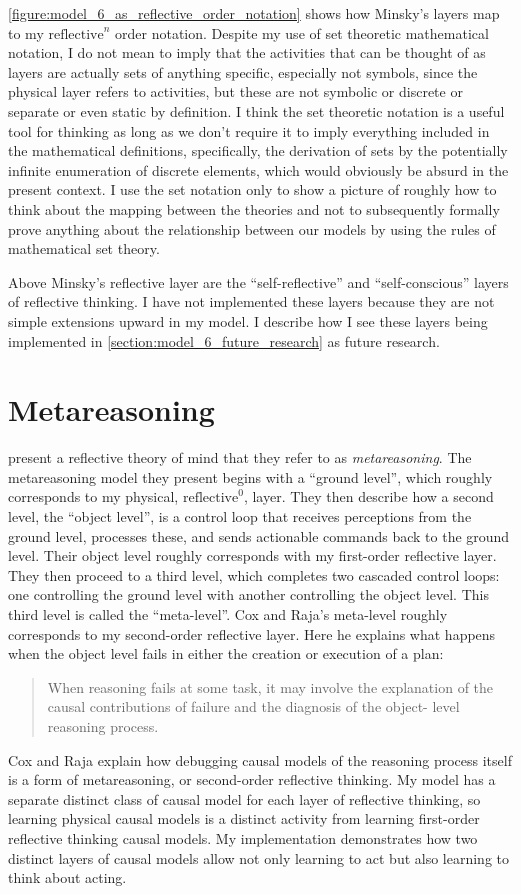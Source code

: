\autoref{figure:model_6_as_reflective_order_notation} shows how
Minsky's layers map to my $\text{reflective}^n$ order notation.
Despite my use of set theoretic mathematical notation, I do not mean
to imply that the activities that can be thought of as layers are
actually sets of anything specific, especially not symbols, since the
physical layer refers to activities, but these are not symbolic or
discrete or separate or even static by definition.  I think the set
theoretic notation is a useful tool for thinking as long as we don't
require it to imply everything included in the mathematical
definitions, specifically, the derivation of sets by the potentially
infinite enumeration of discrete elements, which would obviously be
absurd in the present context.  I use the set notation only to show a
picture of roughly how to think about the mapping between the theories
and not to subsequently formally prove anything about the relationship
between our models by using the rules of mathematical set theory.

Above Minsky's reflective layer are the ``self-reflective'' and
``self-conscious'' layers of reflective thinking.  I have not
implemented these layers because they are not simple extensions upward
in my model.  I describe how I see these layers being implemented in
\autoref{section:model_6_future_research} as future research.

\section{Metareasoning}

\cite{cox_and_raja:2008} present a reflective theory of mind that they
refer to as \emph{metareasoning}.  The metareasoning model they
present begins with a ``ground level'', which roughly corresponds to
my physical, $\text{reflective}^0$, layer.  They then describe how a
second level, the ``object level'', is a control loop that receives
perceptions from the ground level, processes these, and sends
actionable commands back to the ground level.  Their object level
roughly corresponds with my first-order reflective layer.  They then
proceed to a third level, which completes two cascaded control loops:
one controlling the ground level with another controlling the object
level.  This third level is called the ``meta-level''.  Cox and Raja's
meta-level roughly corresponds to my second-order reflective layer.
Here he explains what happens when the object level fails in either
the creation or execution of a plan:
\begin{quote}
When reasoning fails at some task, it may involve the explanation of
the causal contributions of failure and the diagnosis of the object-
level reasoning process.
\end{quote}
Cox and Raja explain how debugging causal models of the reasoning
process itself is a form of metareasoning, or second-order reflective
thinking.  My model has a separate distinct class of causal model for
each layer of reflective thinking, so learning physical causal models
is a distinct activity from learning first-order reflective thinking
causal models.  My implementation demonstrates how two distinct layers
of causal models allow not only learning to act but also learning to
think about acting.

